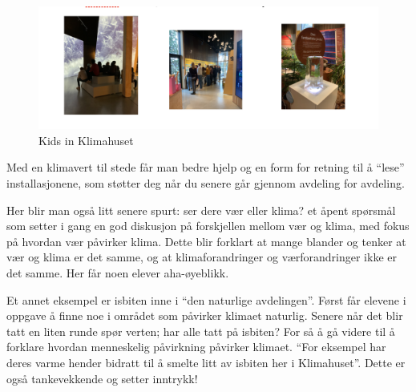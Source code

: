 \begin{figure}[H]
\centering 
\includegraphics[width=13cm]{pictures/elever_i_klimahuset.png}
\caption{Kids in Klimahuset}
\end{figure}

Med en klimavert til stede får man bedre hjelp og en form for retning til å “lese” installasjonene, som støtter deg når du senere går gjennom avdeling for avdeling. 

Her blir man også litt senere spurt: ser dere vær eller klima? et åpent spørsmål som setter i gang en god diskusjon på forskjellen mellom vær og klima, med fokus på hvordan vær påvirker klima. Dette blir forklart at mange blander og tenker at vær og klima er det samme, og at klimaforandringer og værforandringer ikke er det samme. Her får noen elever aha-øyeblikk.


Et annet eksempel er isbiten inne i “den naturlige avdelingen”.  Først får elevene i oppgave å finne noe i området som påvirker klimaet naturlig. Senere når det blir tatt en liten runde spør verten; har alle tatt på isbiten? For så å gå videre til å forklare hvordan menneskelig påvirkning påvirker klimaet. “For eksempel har deres varme hender bidratt til å smelte litt av isbiten her i Klimahuset”. Dette er også tankevekkende og setter inntrykk!



